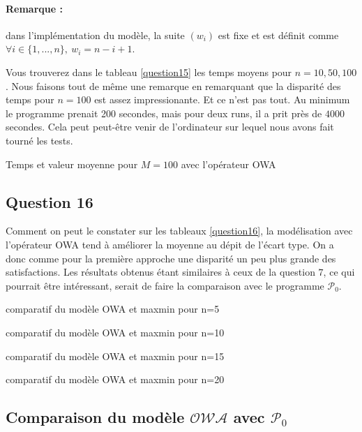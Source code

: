\documentclass[a4paper, titlepage, oneside, 12pt]{article}%
\begin{document}
\paragraph{Remarque :} dans l'implémentation du modèle, la suite $(w_i)$ est fixe et est définit comme $\forall i \in \{1,...,n\},\ w_i=n-i+1$.

Vous trouverez dans le tableau \ref{question15} les temps moyens pour $n=10,50,100$. Nous faisons tout de même une remarque en remarquant que la disparité des temps pour $n=100$ est assez impressionante. Et ce n'est pas tout. Au minimum le programme prenait 200 secondes, mais pour deux runs, il a prit près de $4000$ secondes. Cela peut peut-être venir de l'ordinateur sur lequel nous avons fait tourné les tests.
\begin{table}
\centerline{
}
\caption{Temps et valeur moyenne pour $M=100$ avec l'opérateur OWA}
\label{question15}
\end{table}

\subsection{Question 16}
Comment on peut le constater sur les tableaux \ref{question16}, la modélisation avec l'opérateur OWA tend à améliorer la moyenne au dépit de l'écart type. On a donc comme pour la première approche une disparité un peu plus grande des satisfactions. Les résultats obtenus étant similaires à ceux de la question $7$, ce qui pourrait être intéressant, serait de faire la comparaison avec le programme $\mathcal{P}_0$.
\begin{table}
\centerline{
}
\caption{comparatif du modèle OWA et maxmin pour n=5  }
\centerline{
}
\caption{comparatif du modèle OWA et maxmin pour n=10 }
\centerline{
}
\caption{comparatif du modèle OWA et maxmin pour n=15 }
\centerline{
}
\caption{comparatif du modèle OWA et maxmin pour n=20 }

\label{question16}
\end{table}

\subsection{Comparaison du modèle $\mathcal{OWA}$ avec $\mathcal{P}_0$}
\end{document}
